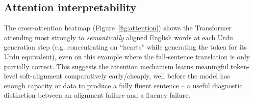 \documentclass[conference]{IEEEtran}
\begin{document}
\subsection{Attention interpretability}
The cross-attention heatmap (Figure~\ref{fig:attention}) shows the
Transformer attending most strongly to \emph{semantically} aligned English
words at each Urdu generation step (e.g. concentrating on ``hearts'' while
generating the token for its Urdu equivalent), even on this example where
the full-sentence translation is only partially correct. This suggests the
attention mechanism learns meaningful token-level soft-alignment
comparatively early/cheaply, well before the model has enough capacity or
data to produce a fully fluent sentence -- a useful diagnostic distinction
between an alignment failure and a fluency failure.
\end{document}
